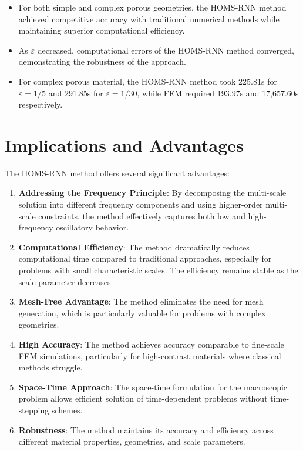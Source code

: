 \documentclass[11pt]{article}
\begin{document}
\begin{itemize}
    \item For both simple and complex porous geometries, the HOMS-RNN method achieved competitive accuracy with traditional numerical methods while maintaining superior computational efficiency.
    
    \item As $\varepsilon$ decreased, computational errors of the HOMS-RNN method converged, demonstrating the robustness of the approach.
    
    \item For complex porous material, the HOMS-RNN method took 225.81s for $\varepsilon=1/5$ and 291.85s for $\varepsilon=1/30$, while FEM required 193.97s and 17,657.60s respectively.
\end{itemize}

\section{Implications and Advantages}

The HOMS-RNN method offers several significant advantages:

\begin{enumerate}
    \item \textbf{Addressing the Frequency Principle}: By decomposing the multi-scale solution into different frequency components and using higher-order multi-scale constraints, the method effectively captures both low and high-frequency oscillatory behavior.
    
    \item \textbf{Computational Efficiency}: The method dramatically reduces computational time compared to traditional approaches, especially for problems with small characteristic scales. The efficiency remains stable as the scale parameter decreases.
    
    \item \textbf{Mesh-Free Advantage}: The method eliminates the need for mesh generation, which is particularly valuable for problems with complex geometries.
    
    \item \textbf{High Accuracy}: The method achieves accuracy comparable to fine-scale FEM simulations, particularly for high-contrast materials where classical methods struggle.
    
    \item \textbf{Space-Time Approach}: The space-time formulation for the macroscopic problem allows efficient solution of time-dependent problems without time-stepping schemes.
    
    \item \textbf{Robustness}: The method maintains its accuracy and efficiency across different material properties, geometries, and scale parameters.
\end{enumerate}
\end{document}
